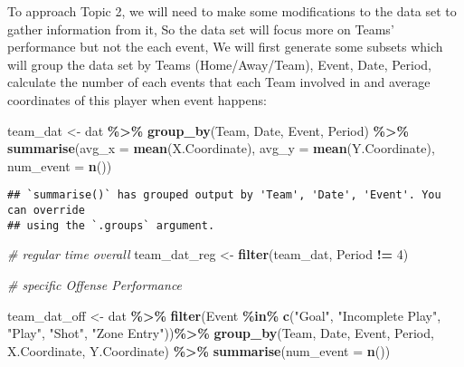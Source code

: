 \documentclass[
  a3paper,
]{article}
\newenvironment{Shaded}{\begin{snugshade}}{\end{snugshade}}
\newcommand{\AttributeTok}[1]{\textcolor[rgb]{0.13,0.29,0.53}{#1}}
\newcommand{\CommentTok}[1]{\textcolor[rgb]{0.56,0.35,0.01}{\textit{#1}}}
\newcommand{\DecValTok}[1]{\textcolor[rgb]{0.00,0.00,0.81}{#1}}
\newcommand{\FunctionTok}[1]{\textcolor[rgb]{0.13,0.29,0.53}{\textbf{#1}}}
\newcommand{\NormalTok}[1]{#1}
\newcommand{\OtherTok}[1]{\textcolor[rgb]{0.56,0.35,0.01}{#1}}
\newcommand{\SpecialCharTok}[1]{\textcolor[rgb]{0.81,0.36,0.00}{\textbf{#1}}}
\newcommand{\StringTok}[1]{\textcolor[rgb]{0.31,0.60,0.02}{#1}}
\begin{document}
To approach Topic 2, we will need to make some modifications to the data
set to gather information from it, So the data set will focus more on
Teams' performance but not the each event, We will first generate some
subsets which will group the data set by Teams (Home/Away/Team), Event,
Date, Period, calculate the number of each events that each Team
involved in and average coordinates of this player when event happens:

\begin{Shaded}
\begin{Highlighting}[]
\NormalTok{team\_dat }\OtherTok{\textless{}{-}}\NormalTok{ dat }\SpecialCharTok{\%\textgreater{}\%} \FunctionTok{group\_by}\NormalTok{(Team, Date, Event, Period) }\SpecialCharTok{\%\textgreater{}\%} \FunctionTok{summarise}\NormalTok{(}\AttributeTok{avg\_x =} \FunctionTok{mean}\NormalTok{(X.Coordinate), }\AttributeTok{avg\_y =} \FunctionTok{mean}\NormalTok{(Y.Coordinate), }\AttributeTok{num\_event =} \FunctionTok{n}\NormalTok{())}
\end{Highlighting}
\end{Shaded}

\begin{verbatim}
## `summarise()` has grouped output by 'Team', 'Date', 'Event'. You can override
## using the `.groups` argument.
\end{verbatim}

\begin{Shaded}
\begin{Highlighting}[]
\CommentTok{\# regular time overall}
\NormalTok{team\_dat\_reg }\OtherTok{\textless{}{-}} \FunctionTok{filter}\NormalTok{(team\_dat, Period }\SpecialCharTok{!=} \DecValTok{4}\NormalTok{)}


\CommentTok{\# specific Offense Performance}

\NormalTok{team\_dat\_off }\OtherTok{\textless{}{-}}\NormalTok{  dat }\SpecialCharTok{\%\textgreater{}\%}
  \FunctionTok{filter}\NormalTok{(Event }\SpecialCharTok{\%in\%} \FunctionTok{c}\NormalTok{(}\StringTok{"Goal"}\NormalTok{, }\StringTok{"Incomplete Play"}\NormalTok{, }\StringTok{"Play"}\NormalTok{, }\StringTok{"Shot"}\NormalTok{, }\StringTok{"Zone Entry"}\NormalTok{))}\SpecialCharTok{\%\textgreater{}\%}
  \FunctionTok{group\_by}\NormalTok{(Team, Date, Event, Period, X.Coordinate, Y.Coordinate) }\SpecialCharTok{\%\textgreater{}\%} 
  \FunctionTok{summarise}\NormalTok{(}\AttributeTok{num\_event =} \FunctionTok{n}\NormalTok{())}
\end{Highlighting}
\end{Shaded}
\end{document}
